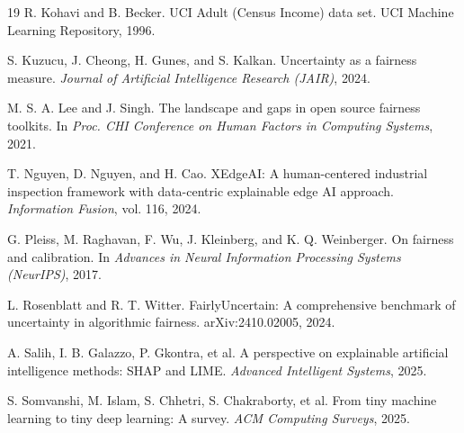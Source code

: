 \documentclass{article}
\begin{document}
\begin{thebibliography}{19}
R. Kohavi and B. Becker.
\newblock UCI Adult (Census Income) data set.
\newblock UCI Machine Learning Repository, 1996.

S. Kuzucu, J. Cheong, H. Gunes, and S. Kalkan.
\newblock Uncertainty as a fairness measure.
\newblock \emph{Journal of Artificial Intelligence Research (JAIR)}, 2024.

M. S. A. Lee and J. Singh.
\newblock The landscape and gaps in open source fairness toolkits.
\newblock In \emph{Proc. CHI Conference on Human Factors in Computing Systems}, 2021.

T. Nguyen, D. Nguyen, and H. Cao.
\newblock XEdgeAI: A human-centered industrial inspection framework with data-centric explainable edge AI approach.
\newblock \emph{Information Fusion}, vol. 116, 2024.

G. Pleiss, M. Raghavan, F. Wu, J. Kleinberg, and K. Q. Weinberger.
\newblock On fairness and calibration.
\newblock In \emph{Advances in Neural Information Processing Systems (NeurIPS)}, 2017.

L. Rosenblatt and R. T. Witter.
\newblock FairlyUncertain: A comprehensive benchmark of uncertainty in algorithmic fairness.
\newblock arXiv:2410.02005, 2024.

A. Salih, I. B. Galazzo, P. Gkontra, et al.
\newblock A perspective on explainable artificial intelligence methods: SHAP and LIME.
\newblock \emph{Advanced Intelligent Systems}, 2025.

S. Somvanshi, M. Islam, S. Chhetri, S. Chakraborty, et al.
\newblock From tiny machine learning to tiny deep learning: A survey.
\newblock \emph{ACM Computing Surveys}, 2025.

\end{thebibliography}
\end{document}
